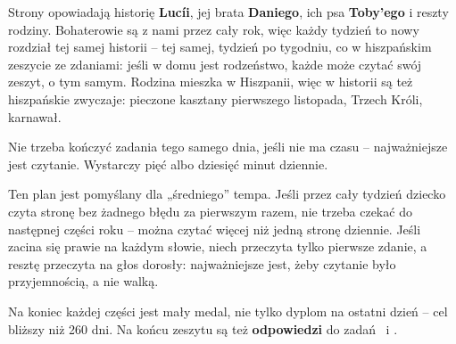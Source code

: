 Strony opowiadają historię \textbf{Lucíi}, jej brata \textbf{Daniego},
ich psa \textbf{Toby'ego} i reszty rodziny. Bohaterowie są z nami przez
cały rok, więc każdy tydzień to nowy rozdział tej samej historii -- tej
samej, tydzień po tygodniu, co w hiszpańskim zeszycie ze zdaniami: jeśli
w domu jest rodzeństwo, każde może czytać swój zeszyt, o tym samym.
Rodzina mieszka w Hiszpanii, więc w historii są też hiszpańskie
zwyczaje: pieczone kasztany pierwszego listopada, Trzech Króli,
karnawał.

Nie trzeba kończyć zadania tego samego dnia, jeśli nie ma czasu --
najważniejsze jest czytanie. Wystarczy pięć albo dziesięć minut
dziennie.

Ten plan jest pomyślany dla „średniego” tempa. Jeśli przez cały tydzień
dziecko czyta stronę bez żadnego błędu za pierwszym razem, nie trzeba
czekać do następnej części roku -- można czytać więcej niż jedną stronę
dziennie. Jeśli zacina się prawie na każdym słowie, niech przeczyta tylko
pierwsze zdanie, a resztę przeczyta na głos dorosły: najważniejsze jest,
żeby czytanie było przyjemnością, a nie walką.

Na koniec każdej części jest mały medal, nie tylko dyplom na ostatni
dzień -- cel bliższy niż 260 dni. Na końcu zeszytu są też
\textbf{odpowiedzi} do zadań \lblAdivina\ i \lblRelaciona.
\newpage
